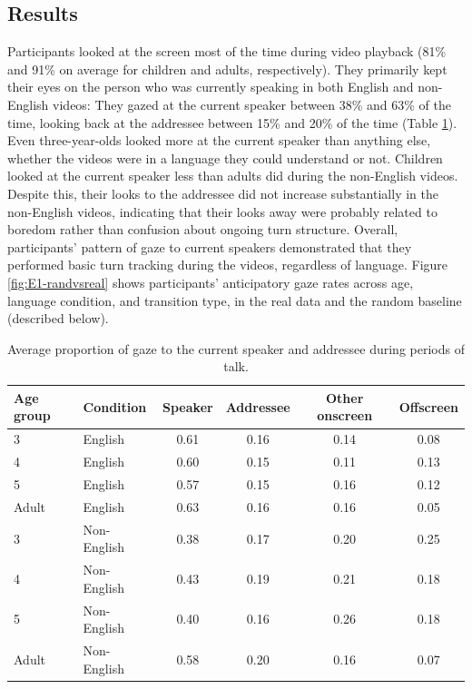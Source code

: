 \documentclass[authoryear, 12pt]{elsarticle}
\begin{document}
\subsection{Results}
\label{sec:results1}

Participants looked at the screen most of the time during video playback (81\% and 91\% on average for children and adults, respectively). They primarily kept their eyes on the person who was currently speaking in both English and non-English videos: They gazed at the current speaker between 38\% and 63\% of the time, looking back at the addressee between 15\% and 20\% of the time (Table \ref{tab:e1_look}). Even three-year-olds looked more at the current speaker than anything else, whether the videos were in a language they could understand or not. Children looked at the current speaker less than adults did during the non-English videos. Despite this, their looks to the addressee did not increase substantially in the non-English videos, indicating that their looks away were probably related to boredom rather than confusion about ongoing turn structure. Overall, participants' pattern of gaze to current speakers demonstrated that they performed basic turn tracking during the videos, regardless of language. Figure \ref{fig:E1-randvsreal} shows participants' anticipatory gaze rates across age, language condition, and transition type, in the real data and the random baseline (described below).

\begin{table}[t]
\begin{center}
  \begin{tabular}{llcccc}
    \hline
    Age group & Condition & Speaker & Addressee & Other onscreen & Offscreen\\ 
    \hline
    3 & English & 0.61 & 0.16 & 0.14 & 0.08 \\ 
    4 & English & 0.60 & 0.15 & 0.11 & 0.13 \\ 
    5 & English & 0.57 & 0.15 & 0.16 & 0.12 \\ 
    Adult & English & 0.63 & 0.16 & 0.16 & 0.05 \\ 
    3 & Non-English & 0.38 & 0.17 & 0.20 & 0.25 \\ 
    4 & Non-English & 0.43 & 0.19 & 0.21 & 0.18 \\ 
    5 & Non-English & 0.40 & 0.16 & 0.26 & 0.18 \\ 
    Adult & Non-English & 0.58 & 0.20 & 0.16 & 0.07 \\ 
    \hline
  \end{tabular}
\end{center}
  \caption{Average proportion of gaze to the current speaker and addressee during periods of talk.}
\label{tab:e1_look}
\end{table}
\end{document}
